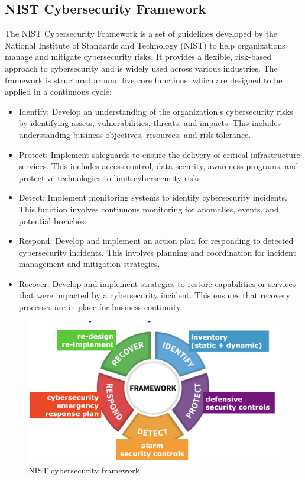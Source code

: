 \subsection{NIST Cybersecurity Framework}
The NIST Cybersecurity Framework is a set of guidelines developed by the National Institute of Standards and Technology (NIST) to help organizations manage and mitigate cybersecurity risks. It provides a flexible, risk-based approach to cybersecurity and is widely used across various industries. The framework is structured around five core functions, which are designed to be applied in a continuous cycle:
\begin{itemize}
    \item Identify: Develop an understanding of the organization’s cybersecurity risks by identifying assets, vulnerabilities, threats, and impacts. This includes understanding business objectives, resources, and risk tolerance.
    \item Protect: Implement safeguards to ensure the delivery of critical infrastructure services. This includes access control, data security, awareness programs, and protective technologies to limit cybersecurity risks.
    \item Detect: Implement monitoring systems to identify cybersecurity incidents. This function involves continuous monitoring for anomalies, events, and potential breaches.
    \item Respond: Develop and implement an action plan for responding to detected cybersecurity incidents. This involves planning and coordination for incident management and mitigation strategies.
    \item Recover: Develop and implement strategies to restore capabilities or services that were impacted by a cybersecurity incident. This ensures that recovery processes are in place for business continuity.
\end{itemize}

\begin{figure}[H]
    \centering
    \includegraphics[width=0.5\linewidth]{Images/Introduction/nistFramework.png}
    \caption{NIST cybersecurity framework}
\end{figure}